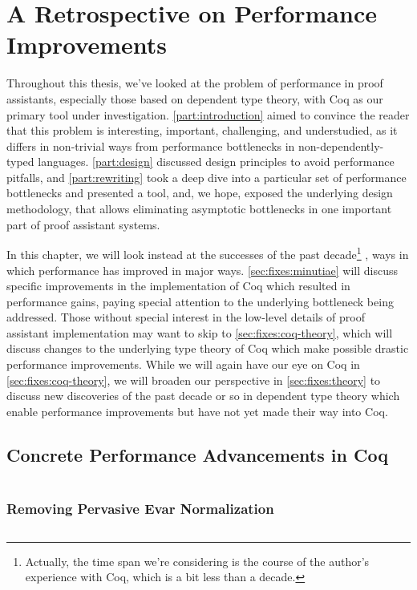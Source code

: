 \chapter{A Retrospective on Performance Improvements} \label{ch:coq-tooling-fixes}
Throughout this thesis, we've looked at the problem of performance in proof assistants, especially those based on dependent type theory, with Coq as our primary tool under investigation.
\autoref{part:introduction} aimed to convince the reader that this problem is interesting, important, challenging, and understudied, as it differs in non-trivial ways from performance bottlenecks in non-dependently-typed languages.
\autoref{part:design} discussed design principles to avoid performance pitfalls, and \autoref{part:rewriting} took a deep dive into a particular set of performance bottlenecks and presented a tool, and, we hope, exposed the underlying design methodology, that allows eliminating asymptotic bottlenecks in one important part of proof assistant systems.

In this chapter, we will look instead at the successes of the past decade\footnote{%
  Actually, the time span we're considering is the course of the author's experience with Coq, which is a bit less than a decade.%
}%
, ways in which performance has improved in major ways.
\autoref{sec:fixes:minutiae} will discuss specific improvements in the implementation of Coq which resulted in performance gains, paying special attention to the underlying bottleneck being addressed.
Those without special interest in the low-level details of proof assistant implementation may want to skip to \autoref{sec:fixes:coq-theory}, which will discuss changes to the underlying type theory of Coq which make possible drastic performance improvements.
While we will again have our eye on Coq in \autoref{sec:fixes:coq-theory}, we will broaden our perspective in \autoref{sec:fixes:theory} to discuss new discoveries of the past decade or so in dependent type theory which enable performance improvements but have not yet made their way into Coq.

\section{Concrete Performance Advancements in Coq}\label{sec:fixes:minutiae}
$\left.\right.$
\subsection{Removing Pervasive Evar Normalization}\label{sec:econstr}
$\left.\right.$
